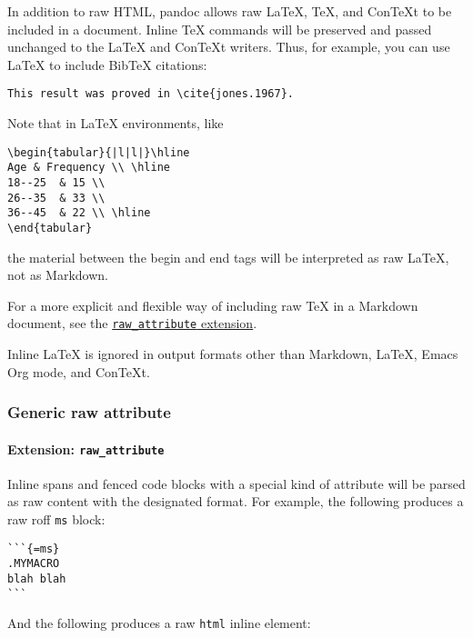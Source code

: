 \documentclass[
]{article}
\begin{document}
In addition to raw HTML, pandoc allows raw LaTeX, TeX, and ConTeXt to be
included in a document. Inline TeX commands will be preserved and passed
unchanged to the LaTeX and ConTeXt writers. Thus, for example, you can
use LaTeX to include BibTeX citations:

\begin{verbatim}
This result was proved in \cite{jones.1967}.
\end{verbatim}

Note that in LaTeX environments, like

\begin{verbatim}
\begin{tabular}{|l|l|}\hline
Age & Frequency \\ \hline
18--25  & 15 \\
26--35  & 33 \\
36--45  & 22 \\ \hline
\end{tabular}
\end{verbatim}

the material between the begin and end tags will be interpreted as raw
LaTeX, not as Markdown.

For a more explicit and flexible way of including raw TeX in a Markdown
document, see the
\hyperref[extension-raw_attribute]{\texttt{raw\_attribute} extension}.

Inline LaTeX is ignored in output formats other than Markdown, LaTeX,
Emacs Org mode, and ConTeXt.

\subsubsection{Generic raw attribute}\label{generic-raw-attribute}

\paragraph{\texorpdfstring{Extension:
\texttt{raw\_attribute}}{Extension: raw\_attribute}}\label{extension-raw_attribute}

Inline spans and fenced code blocks with a special kind of attribute
will be parsed as raw content with the designated format. For example,
the following produces a raw roff \texttt{ms} block:

\begin{verbatim}
```{=ms}
.MYMACRO
blah blah
```
\end{verbatim}

And the following produces a raw \texttt{html} inline element:
\end{document}
